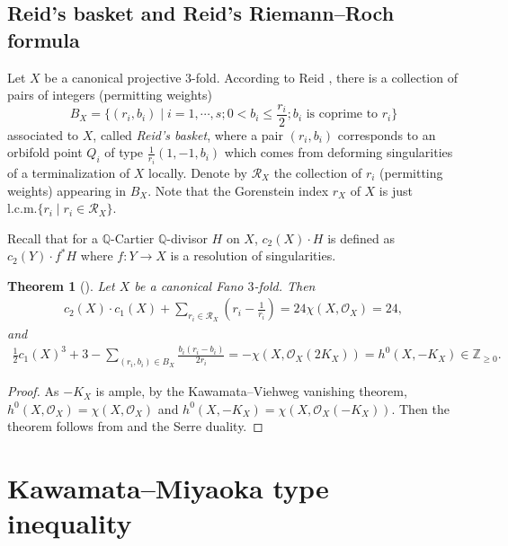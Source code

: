 \documentclass[12pt,twoside]{amsart}
\newcommand\lcm{{\text{l.c.m.}}}
\newtheorem{thm}{Theorem}[section]
\theoremstyle{definition}
\begin{document}
\subsection{Reid's basket and Reid's Riemann--Roch formula}
Let $X$ be a canonical projective $3$-fold. According to Reid \cite[(10.2)]{Reid1987}, there is a collection of pairs of integers (permitting weights)
\[
 B_{X}=\{(r_{i}, b_{i}) \mid i=1, \cdots, s ; 0<b_{i}\leq\frac{r_{i}}{2} ; b_{i} \text{ is coprime to } r_{i}\}
\]
associated to $X$, called {\it Reid's basket}, where a pair $\left(r_{i}, b_{i}\right)$ corresponds to an orbifold point $Q_{i}$ of type $\frac{1}{r_{i}}\left(1, -1, b_{i}\right)$ which comes from deforming singularities of a terminalization of $X$ locally. 
Denote by $\mathcal{R}_X$ the collection of $r_i$ (permitting weights) appearing in $B_X$. 
Note that the Gorenstein index $r_X$ of $X$ is just $\lcm\{r_i\mid r_i\in \mathcal{R}_X\}$.

 

Recall that for a $\mathbb{Q}$-Cartier $\mathbb{Q}$-divisor $H$ on $X$, $c_2(X)\cdot H$ is defined as $c_2(Y)\cdot f^*H$ where $f\colon Y\to X$ is a resolution of singularities.


\begin{thm}[{\cite[(10.3)]{Reid1987}}]\label{thm.euler}
Let $X$ be a canonical Fano $3$-fold. Then
\begin{align}\label{eq.range}
 c_2(X)\cdot c_1(X) + \sum_{r_i\in \mathcal{R}_X} \left(r_i-\frac{1}{r_i}\right)=24\chi(X, \mathcal O_X)=24,
\end{align}
and 
\begin{align}\label{eq.RR-Fano}
 \frac{1}{2}c_1(X)^3+3- \sum_{(r_i,b_i)\in B_X}\frac{b_i(r_i-b_i)}{2r_i}=-\chi(X, \mathcal{O}_X(2K_X))= h^0(X,-K_X)\in \mathbb Z_{\geq 0}.
 \end{align}
\end{thm}
 

\begin{proof}
 As $-K_X$ is ample, by the Kawamata--Viehweg vanishing theorem, $h^0(X, \mathcal{O}_X)=\chi(X, \mathcal{O}_X)$ and $h^0(X,-K_X)=\chi(X, \mathcal{O}_X(-K_X) )$. Then the theorem follows from \cite[(10.3)]{Reid1987} and the Serre duality.
\end{proof}
 

\section{Kawamata--Miyaoka type inequality}\label{sec.upperbound}
\end{document}
